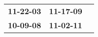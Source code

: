 \begin{supertabular}{p{0.33\columnwidth}p{0.33\columnwidth}p{0.33\columnwidth}}
 \textbf{11-22-03\textsuperscript{}} &  \textbf{11-17-09\textsuperscript{}} \\
 \textbf{10-09-08\textsuperscript{}} &  \textbf{11-02-11\textsuperscript{}} \\
\end{supertabular}
